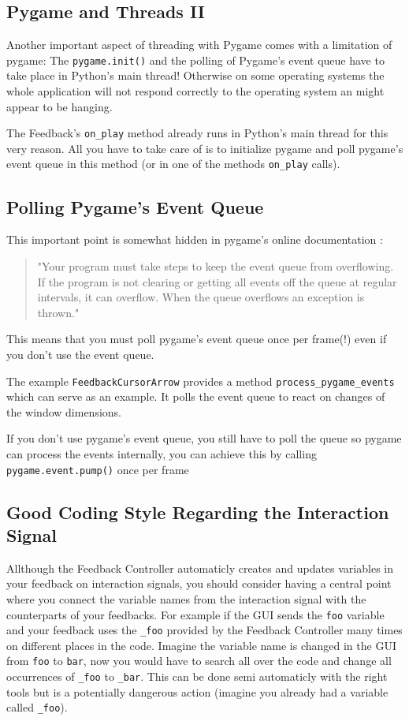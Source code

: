 \subsection{Pygame and Threads II}
Another important aspect of threading with Pygame comes with a limitation of pygame: The \lstinline+pygame.init()+ and the polling of Pygame's event queue have to take place in Python's main thread! Otherwise on some operating systems the whole application will not respond correctly to the operating system an might appear to be hanging.

The Feedback's \lstinline+on_play+ method already runs in Python's main thread for this very reason. All you have to take care of is to initialize pygame and poll pygame's event queue in this method (or in one of the methods \lstinline+on_play+ calls).

\subsection{Polling Pygame's Event Queue}
This important point is somewhat hidden in pygame's online documentation \cite{ref:pygame-events}: 
\begin{quotation}
"Your program must take steps to keep the event queue from overflowing. If the program is not clearing or getting all events off the queue at regular intervals, it can overflow. When the queue overflows an exception is thrown."
\end{quotation}

This means that you must poll pygame's event queue once per frame(!) even if you don't use the event queue.

The example \lstinline+FeedbackCursorArrow+ provides a method \lstinline+process_pygame_events+ which can serve as an example. It polls the event queue to react on changes of the window dimensions.

If you don't use pygame's event queue, you still have to poll the queue so pygame can process the events internally, you can achieve this by calling \lstinline+pygame.event.pump()+ once per frame

\subsection{Good Coding Style Regarding the Interaction Signal}
\label{ref:codingstyle-is}
Allthough the Feedback Controller automaticly creates and updates variables in your feedback on interaction signals, you should consider having a central point where you connect the variable names from the interaction signal with the counterparts of your feedbacks. For example if the GUI sends the \verb+foo+ variable and your feedback uses the \lstinline+_foo+ provided by the Feedback Controller many times on different places in the code. Imagine the variable name is changed in the GUI from \verb+foo+ to \verb+bar+, now you would have to search all over the code and change all occurrences of \lstinline+_foo+ to \lstinline+_bar+. This can be done semi automaticly with the right tools but is a potentially dangerous action (imagine you already had a variable called \lstinline+_foo+).

